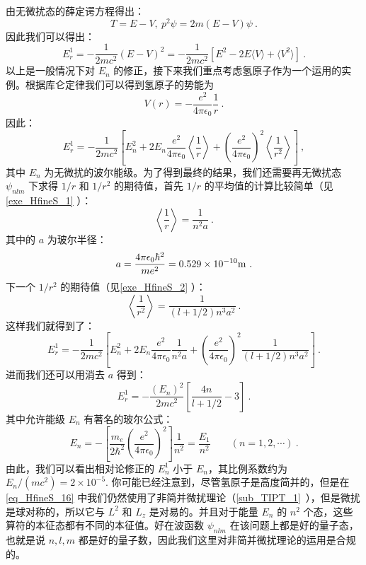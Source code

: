 由无微扰态的薛定谔方程得出：
\begin{equation}
T=E-V, \ p^2\psi = 2m(E-V)\psi~.
\end{equation}
因此我们可以得出：
\begin{equation}
E_r^1=-\frac{1}{2mc^2}(E-V)^2=-\frac{1}{2mc^2}[E^2-2E\langle V\rangle+\langle V^2\rangle]~.
\end{equation}
以上是一般情况下对 $E_n$ 的修正，接下来我们重点考虑氢原子作为一个运用的实例。根据库仑定律我们可以得到氢原子的势能为
\begin{equation}
V(r)=-\frac{e^2}{4\pi\epsilon_0}\frac{1}{r}~.
\end{equation}
因此：
\begin{equation}
E_r^1=-\frac{1}{2mc^2}\left[E_n^2+2E_n\frac{e^2}{4\pi\epsilon_0}\left\langle \frac{1}{r}\right\rangle+\left(\frac{e^2}{4\pi\epsilon_0}\right)^2\left\langle \frac{1}{r^2}\right\rangle\right]~,
\end{equation}
其中 $E_n$ 为无微扰的波尔能级。为了得到最终的结果，我们还需要再无微扰态 $\psi_{nlm}$ 下求得 $1/r$ 和 $1/r^2$ 的期待值，首先 $1/r$ 的平均值的计算比较简单（见\autoref{exe_HfineS_1} ）：
\begin{equation}
\left\langle\frac{1}{r}\right\rangle = \frac{1}{n^2a}~.
\end{equation}
其中的 $a$ 为玻尔半径：
\begin{equation}
a=\frac{4\pi\epsilon_0\hbar^2}{me^2}=0.529\times 10^{-10}\rm{m}~.
\end{equation}
下一个 $1/r^2$ 的期待值（见\autoref{exe_HfineS_2} ）：
\begin{equation}
\left\langle \frac{1}{r^2}\right\rangle = \frac{1}{(l+1/2)n^3a^2}~.
\end{equation}
这样我们就得到了：
\begin{equation}
E_r^1=-\frac{1}{2mc^2}\left[E_n^2+2E_n\frac{e^2}{4\pi\epsilon_0}\frac{1}{n^2a}+\left(\frac{e^2}{4\pi\epsilon_0}\right)^2\frac{1}{(l+1/2)n^3a^2}\right]~.
\end{equation}
进而我们还可以用消去 $a$ 得到：
\begin{equation}\label{eq_HfineS_21}
E_r^1=-\frac{(E_n)^2}{2mc^2}\left[\frac{4n}{l+1/2}-3\right]~.
\end{equation}
其中允许能级 $E_n$ 有著名的玻尔公式：
\begin{equation}
E_{n} =-\left[\frac {m_e}{2\hbar^{2}} \left(\frac {e^ {2}}{4\pi \epsilon_0}\right)^ {2}\right]  \frac {1}{n^ {2}}  =  \frac {E_ {1}}{n^ {2}}\qquad  (n=1,2,\cdots) ~.
\end{equation}
由此，我们可以看出相对论修正的 $E^1_n$ 小于 $E_n$，其比例系数约为 $E_n/(mc^2)=2\times 10^{-5}$.
你可能已经注意到，尽管氢原子是高度简并的，但是在\autoref{eq_HfineS_16} 中我们仍然使用了非简并微扰理论（\autoref{sub_TIPT_1}~），但是微扰是球对称的，所以它与 $L^2$ 和 $L_z$ 是对易的。并且对于能量 $E_n$ 的 $n^2$ 个态，这些算符的本征态都有不同的本征值。好在波函数 $\psi_{nlm}$ 在该问题上都是好的量子态，也就是说 $n,l,m$ 都是好的量子数，因此我们这里对非简并微扰理论的运用是合规的。


